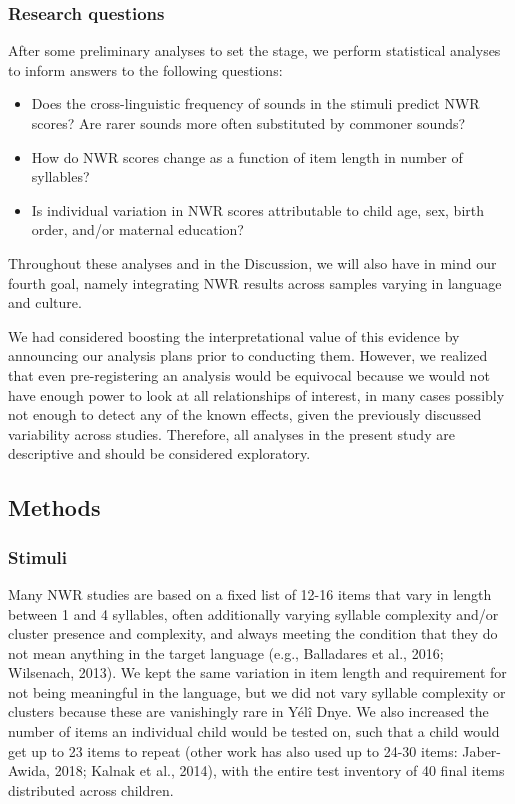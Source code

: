 \documentclass[english,,man,floatsintext]{apa6}
\providecommand{\tightlist}{%
  \setlength{\itemsep}{0pt}\setlength{\parskip}{0pt}}
\begin{document}
\hypertarget{research-questions}{%
\subsubsection{Research questions}\label{research-questions}}

After some preliminary analyses to set the stage, we perform statistical analyses to inform answers to the following questions:

\begin{itemize}
\tightlist
\item
  Does the cross-linguistic frequency of sounds in the stimuli predict NWR scores? Are rarer sounds more often substituted by commoner sounds?
\item
  How do NWR scores change as a function of item length in number of syllables?
\item
  Is individual variation in NWR scores attributable to child age, sex, birth order, and/or maternal education?
\end{itemize}

Throughout these analyses and in the Discussion, we will also have in mind our fourth goal, namely integrating NWR results across samples varying in language and culture.

We had considered boosting the interpretational value of this evidence by announcing our analysis plans prior to conducting them. However, we realized that even pre-registering an analysis would be equivocal because we would not have enough power to look at all relationships of interest, in many cases possibly not enough to detect any of the known effects, given the previously discussed variability across studies. Therefore, all analyses in the present study are descriptive and should be considered exploratory.

\hypertarget{methods}{%
\subsection{Methods}\label{methods}}

\hypertarget{stimuli}{%
\subsubsection{Stimuli}\label{stimuli}}

Many NWR studies are based on a fixed list of 12-16 items that vary in length between 1 and 4 syllables, often additionally varying syllable complexity and/or cluster presence and complexity, and always meeting the condition that they do not mean anything in the target language (e.g., Balladares et al., 2016; Wilsenach, 2013). We kept the same variation in item length and requirement for not being meaningful in the language, but we did not vary syllable complexity or clusters because these are vanishingly rare in Yélî Dnye. We also increased the number of items an individual child would be tested on, such that a child would get up to 23 items to repeat (other work has also used up to 24-30 items: Jaber-Awida, 2018; Kalnak et al., 2014), with the entire test inventory of 40 final items distributed across children.
\end{document}
